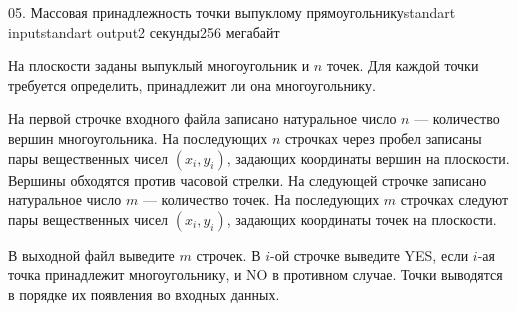 \begin{problem}{05. Массовая принадлежность точки выпуклому прямоугольнику}{standart input}{standart output}{2 секунды}{256 мегабайт}

На плоскости заданы выпуклый многоугольник и $n$ точек. Для каждой точки требуется определить, принадлежит ли она многоугольнику.

\InputFile

На первой строчке входного файла записано натуральное число $n$ --- количество вершин многоугольника. На последующих $n$ строчках через пробел записаны пары вещественных чисел $(x_i, y_i)$, задающих координаты вершин на плоскости. Вершины обходятся против часовой стрелки. На следующей строчке записано натуральное число $m$ --- количество точек. На последующих $m$ строчках следуют пары вещественных чисел $(x_i, y_i)$, задающих координаты точек на плоскости.

\OutputFile

В выходной файл выведите $m$ строчек. В $i$-ой строчке выведите YES, если $i$-ая точка принадлежит многоугольнику, и NO в противном случае. Точки выводятся в порядке их появления во входных данных.

\Examples

\begin{example}%
%
\end{example}

\end{problem}

